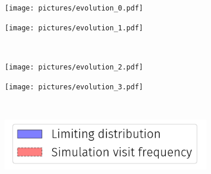 \begin{frame}
    \begin{figure}
        \begin{subfigure}{.49\textwidth}
            \centering
            \texttt{[image: pictures/evolution\_0.pdf]}
          \end{subfigure}
          \begin{subfigure}{.49\textwidth}
            \centering
            \texttt{[image: pictures/evolution\_1.pdf]}
          \end{subfigure}\\
          \begin{subfigure}{0.49\textwidth}
            \centering
            \texttt{[image: pictures/evolution\_2.pdf]}
          \end{subfigure}%
          \begin{subfigure}{0.49\textwidth}
            \centering
            \texttt{[image: pictures/evolution\_3.pdf]}
        \end{subfigure}\\
        \begin{center}
          \begin{subfigure}{0.4\textwidth}
            \centering
            \includegraphics[width=\linewidth]{pictures/legend.png}
          \end{subfigure}\\
        \end{center}
        \end{figure}
\end{frame}


